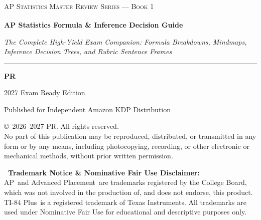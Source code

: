 \documentclass[11pt,oneside,openany]{book}
\newcommand{\BookAuthor}{PR}
\begin{document}
\frontmatter

\begin{titlepage}
\centering
\vspace*{0.5in}

{\Large\scshape AP\textsuperscript{\textregistered} Statistics Master Review Series --- Book 1}\par
\vspace{0.8cm}

{\Huge\bfseries\color{MidnightBlue} AP\textsuperscript{\textregistered} Statistics Formula \& Inference Decision Guide}\par
\vspace{0.4cm}
{\large\itshape The Complete High-Yield Exam Companion: Formula Breakdowns, Mindmaps, Inference Decision Trees, and Rubric Sentence Frames}\par

\vspace{1.2cm}

\rule{0.6\textwidth}{1.0pt}\par
\vspace{1.0cm}

{\Large\bfseries \BookAuthor}\par
\vspace{0.25cm}
{\large 2027 Exam Ready Edition}\par

\vfill

{\small Published for Independent Amazon KDP Distribution}\par
\vspace*{0.3in}
\end{titlepage}

\newpage
\thispagestyle{empty}
\vspace*{1.5in}

\noindent \copyright\ 2026--2027 \BookAuthor. All rights reserved.\\
No part of this publication may be reproduced, distributed, or transmitted in any form or by any means, including photocopying, recording, or other electronic or mechanical methods, without prior written permission.

\vspace{0.2in}

\noindent \textbf{\textregistered\ Trademark Notice \& Nominative Fair Use Disclaimer:}\\
\small{AP\textregistered\ and Advanced Placement\textregistered\ are trademarks registered by the College Board, which was not involved in the production of, and does not endorse, this product. TI-84 Plus\textregistered\ is a registered trademark of Texas Instruments. All trademarks are used under Nominative Fair Use for educational and descriptive purposes only.}
\end{document}
